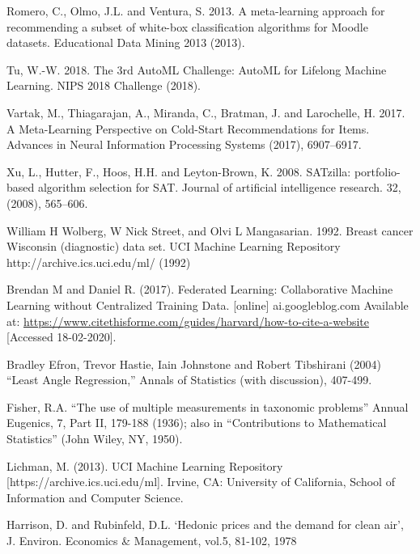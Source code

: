 \documentclass{article}
\begin{document}
\begin{thebibliography}{9}
Romero, C., Olmo, J.L. and Ventura, S. 2013. A meta-learning approach for recommending a subset of white-box classification algorithms for Moodle datasets. Educational Data Mining 2013 (2013).

Tu, W.-W. 2018. The 3rd AutoML Challenge: AutoML for Lifelong Machine Learning. NIPS 2018 Challenge (2018).

Vartak, M., Thiagarajan, A., Miranda, C., Bratman, J. and Larochelle, H. 2017. A Meta-Learning Perspective on Cold-Start Recommendations for Items. Advances in Neural Information Processing Systems (2017), 6907–6917.

Xu, L., Hutter, F., Hoos, H.H. and Leyton-Brown, K. 2008. SATzilla: portfolio-based algorithm selection for SAT. Journal of artificial intelligence research. 32, (2008), 565–606.

William H Wolberg, W Nick Street, and Olvi L Mangasarian. 1992. Breast cancer Wisconsin (diagnostic) data set. UCI Machine Learning Repository {http://archive.ics.uci.edu/ml/} (1992)

Brendan M and Daniel R. (2017). Federated Learning: Collaborative Machine Learning without Centralized Training Data. [online] ai.googleblog.com Available at: \url{https://www.citethisforme.com/guides/harvard/how-to-cite-a-website} [Accessed 18-02-2020].

Bradley Efron, Trevor Hastie, Iain Johnstone and Robert Tibshirani (2004) “Least Angle Regression,” Annals of Statistics (with discussion), 407-499. 

Fisher, R.A. “The use of multiple measurements in taxonomic problems” Annual Eugenics, 7, Part II, 179-188 (1936); also in “Contributions to Mathematical Statistics” (John Wiley, NY, 1950).

Lichman, M. (2013). UCI Machine Learning Repository [https://archive.ics.uci.edu/ml]. Irvine, CA: University of California, School of Information and Computer Science.

Harrison, D. and Rubinfeld, D.L. ‘Hedonic prices and the demand for clean air’, J. Environ. Economics \& Management, vol.5, 81-102, 1978

\end{thebibliography}



\end{document}
